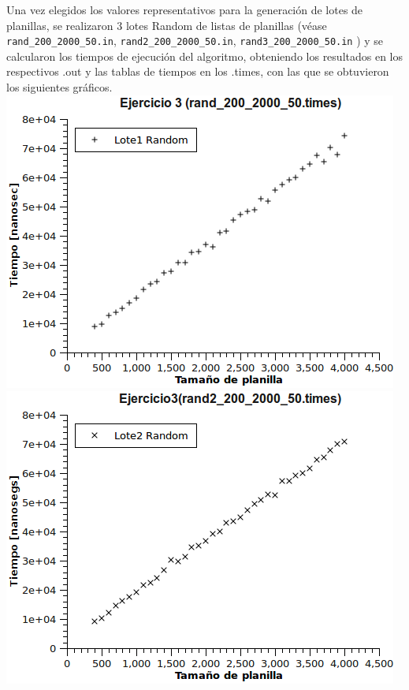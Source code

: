 Una vez elegidos los valores representativos para la generación de lotes de planillas, se realizaron 3 lotes Random de listas de planillas (véase \texttt{rand\_200\_2000\_50.in}, \texttt{rand2\_200\_2000\_50.in}, \texttt{rand3\_200\_2000\_50.in} ) y se calcularon los tiempos de ejecución del algoritmo, obteniendo los resultados en los respectivos .out y las tablas de tiempos en los .times, con las que se obtuvieron los siguientes gráficos.
\newline
\newline
\includegraphics[scale=0.8]{Graph1.png}
\newline
\includegraphics[scale=0.8]{Graph2.png}
\newline
